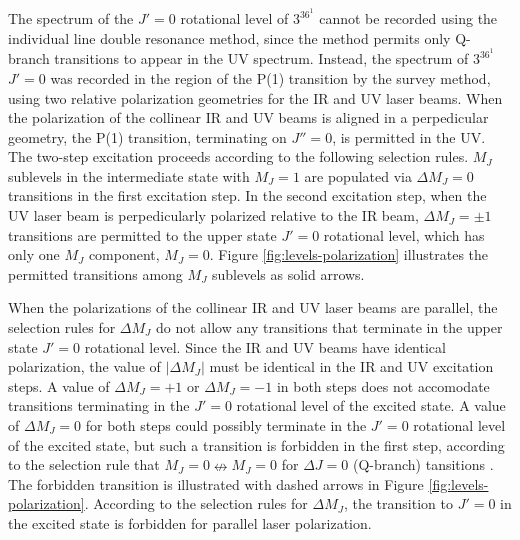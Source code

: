 \documentclass[12pt]{mitthesis}
\begin{document}
The spectrum of the $J'=0$ rotational level of $3^36^1$  cannot
be recorded using the individual line double resonance method, since
the method permits only Q-branch transitions to appear in the UV
spectrum.  Instead, the spectrum of $3^36^1$  $J'=0$ was
recorded in the region of the P(1) transition by the survey method,
using two relative polarization geometries for the IR and UV laser
beams.  When the polarization of the collinear IR and UV beams is
aligned in a perpedicular geometry, the P(1) transition, terminating
on $J''=0$, is permitted in the UV.  The two-step excitation proceeds
according to the following selection rules.  $M_J$ sublevels in the
intermediate state with $M_J=1$ are populated via $\Delta M_J=0$
transitions in the first excitation step.  In the second excitation
step, when the UV laser beam is perpedicularly polarized relative to
the IR beam, $\Delta M_J = \pm 1$ transitions are permitted to the
upper state $J'=0$ rotational level, which has only one $M_J$
component, $M_J=0$.  Figure \ref{fig:levels-polarization} illustrates
the permitted transitions among $M_J$ sublevels as solid arrows.

When the polarizations of the collinear IR and UV laser beams are
parallel, the selection rules for $\Delta M_J$ do not allow any
transitions that terminate in the upper state $J'=0$ rotational level.
Since the IR and UV beams have identical polarization, the value of
$\lvert \Delta M_J \rvert$ must be identical in the IR and UV
excitation steps.  A value of $\Delta M_J = + 1$ or $\Delta M_J = - 1$
in both steps does not accomodate transitions terminating in the
$J'=0$ rotational level of the excited state.  A value of $\Delta M_J
= 0$ for both steps could possibly terminate in the $J'=0$ rotational
level of the excited state, but such a transition is forbidden in the
first step, according to the selection rule that $M_J=0
\nleftrightarrow M_J=0$ for $\Delta J = 0$ (Q-branch) tansitions
\cite{herzberg66}.  The forbidden transition is illustrated with
dashed arrows in Figure \ref{fig:levels-polarization}.  According to
the selection rules for $\Delta M_J$, the transition to $J'=0$ in the
excited state is forbidden for parallel laser
polarization. 

\end{document}
